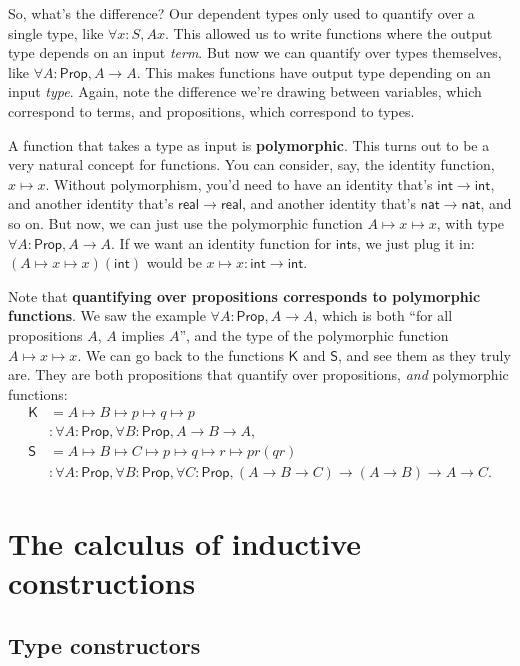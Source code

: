 \documentclass[11pt,paper=letter]{scrartcl}
\newcommand{\sf}{\mathsf}
\newcommand{\prop}{\mathsf{Prop}}
\begin{document}
So, what's the difference? Our dependent types only used to quantify over a single type, like $\forall x: S, Ax$. This allowed us to write functions where the output type depends on an input \emph{term}. But now we can quantify over types themselves, like $\forall A: \prop, A \to A$. This makes functions have output type depending on an input \emph{type}. Again, note the difference we're drawing between variables, which correspond to terms, and propositions, which correspond to types.

A function that takes a type as input is \textbf{polymorphic}. This turns out to be a very natural concept for functions. You can consider, say, the identity function, $x \mapsto x$. Without polymorphism, you'd need to have an identity that's $\sf{int} \to \sf{int}$, and another identity that's $\sf{real} \to \sf{real}$, and another identity that's $\sf{nat} \to \sf{nat}$, and so on. But now, we can just use the polymorphic function $A \mapsto x \mapsto x$, with type $\forall A: \prop, A \to A$. If we want an identity function for $\sf{int}$s, we just plug it in: $(A \mapsto x \mapsto x)(\sf{int})$ would be $x \mapsto x : \sf{int} \to \sf{int}$.

Note that \textbf{quantifying over propositions corresponds to polymorphic functions}. We saw the example $\forall A: \prop, A \to A$, which is both ``for all propositions $A$, $A$ implies $A$'', and the type of the polymorphic function $A \mapsto x \mapsto x$. We can go back to the functions $\sf{K}$ and $\sf{S}$, and see them as they truly are. They are both propositions that quantify over propositions, \emph{and} polymorphic functions:
\begin{align*}
\sf{K} &= A \mapsto B \mapsto p \mapsto q \mapsto p \\
&: \forall A: \prop, \forall B: \prop, A \to B \to A, \\
\sf{S} &= A \mapsto B \mapsto C \mapsto p \mapsto q \mapsto r \mapsto pr(qr) \\
&: \forall A: \prop, \forall B: \prop, \forall C: \prop,
(A \to B \to C) \to (A \to B) \to A \to C.
\end{align*}

\clearpage
\section{The calculus of inductive constructions}

\subsection{Type constructors}
\end{document}
